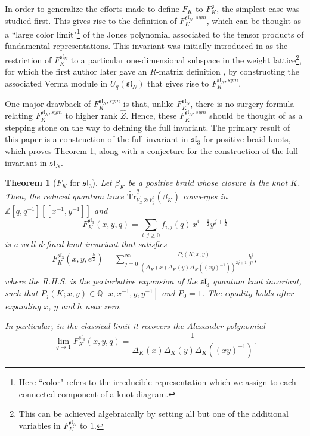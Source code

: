 \documentclass[12pt,oneside,reqno]{amsart}
\def\Q{\mathbb{Q}}
\newtheorem{teorema}{\bf Theorem}
\numberwithin{teorema}{section}
\numberwithin{definicion}{section}
\numberwithin{lema}{section}
\numberwithin{conjetura}{section}
\numberwithin{proposicion}{section}
\def\sl{\mathfrak{sl}}
\def\Uq{U_q}
\def\g{\mathfrak{g}}
\begin{document}
In order to generalize the efforts made to define $F_K$ to $F_K^\g$, the simplest case was studied first. This gives rise to the definition of $F_K^{\sl_N,sym}$, which can be thought as a ``large color limit"\footnote{Here ``color" refers to the irreducible representation which we assign to each connected component of a knot diagram.} of the Jones polynomial associated to the tensor products of fundamental representations. This invariant was initially introduced in \cite{EGGKPS,Park20} as the restriction of $F_K^{\sl_N}$ to a particular one-dimensional subspace in the weight lattice\footnote{This can be achieved algebraically by setting all but one of the additional variables in $F_K^{\sl_N}$ to $1$.}, for which the first author later gave an $R$-matrix definition \cite{gruen22}, by constructing the associated Verma module in $\Uq(\sl_N)$ that gives rise to $F_K^{\sl_N,sym}$.

One major drawback of $F_K^{\sl_N,sym}$ is that, unlike $F_K^{\sl_N}$, there is no surgery formula relating $F_K^{\sl_N,sym}$ to higher rank $\hat{Z}$. Hence, these $F_K^{\sl_N,sym}$ should be thought of as a stepping stone on the way to defining the full invariant. The primary result of this paper is a construction of the full invariant in $\sl_3$ for positive braid knots, which proves Theorem \ref{thm:FK-SU(3)}, along with a conjecture for the construction of the full invariant in $\sl_N$.

\begin{teorema}[$F_K$ for $\sl_3$]\label{thm:FK-SU(3)} Let $\beta_K$  be a positive braid whose closure is the knot $K$. Then, the reduced quantum trace $\widetilde{\text{Tr}}^q_{V_x^{1}\otimes V_y^{2}}(\beta_K)$ converges in $\mathbb{Z}[q,q^{-1}][[x^{-1},y^{-1}]]$ and $$F_K^{\sl_3}(x,y,q)=\sum_{i,j\geq 0} f_{i,j}(q)\,x^{i+\frac12}y^{j+\frac12}$$ is a well-defined knot invariant that satisfies
    \begin{gather}\label{eq:thm-MMR}
        F_K^{\sl_3}(x,y,e^{\frac{h}{2}})=\sum_{j=0}^\infty \frac{P_j(K;x,y)}{\left(\Delta_K(x)\Delta_K(y)\Delta_K\left((xy)^{-1}\right)\right)^{2j+1}}\frac{h^j}{j!},
    \end{gather}
    where the R.H.S. is the perturbative expansion of the $\sl_3$ quantum knot invariant, such that $P_j(K;x,y)\in\Q[x,x^{-1},y,y^{-1}]$ and $P_0=1$. The equality holds after expanding $x$, $y$ and $h$ near zero.
    
    In particular, in the classical limit it recovers the Alexander polynomial
    \begin{equation}\label{eq:thm-alexander}
        \lim_{q\rightarrow 1} F_K^{\sl_3}(x,y,q)=\frac{1}{\Delta_K(x)\Delta_K(y)\Delta_K\left((xy)^{-1}\right)}.
    \end{equation}
\end{teorema}
\end{document}
